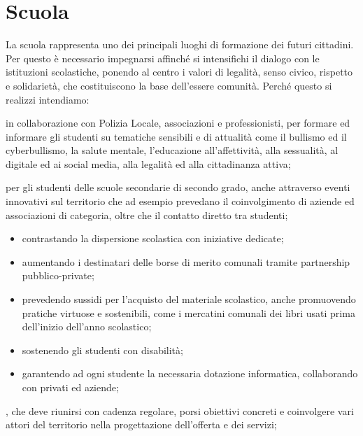 \section{Scuola}
La scuola rappresenta uno dei principali luoghi di formazione dei futuri cittadini. Per questo è necessario  impegnarsi affinché si intensifichi il dialogo con le istituzioni scolastiche, ponendo al centro i valori di legalità, senso civico, rispetto e solidarietà, che costituiscono la base dell'essere comunità. Perché questo si realizzi intendiamo:

 in collaborazione con Polizia Locale, associazioni e professionisti, per formare ed informare gli studenti su tematiche sensibili e di attualità come il bullismo ed il cyberbullismo, la salute mentale, l'educazione all'affettività, alla sessualità, al digitale ed ai social media, alla legalità ed alla cittadinanza attiva;

 per gli studenti delle scuole secondarie di secondo grado, anche attraverso eventi innovativi sul territorio che ad esempio prevedano il coinvolgimento di aziende ed associazioni di categoria, oltre che il contatto diretto tra studenti;

\begin{bluebox}
\begin{itemize}
  \item contrastando la dispersione scolastica con iniziative dedicate; 
  \item aumentando i destinatari delle borse di merito comunali tramite partnership pubblico-private;
  \item prevedendo sussidi per l'acquisto del materiale scolastico, anche promuovendo  pratiche virtuose e sostenibili, come i mercatini comunali dei libri usati prima dell'inizio dell'anno scolastico;
  \item sostenendo gli studenti con disabilità; 
  \item garantendo ad ogni studente la necessaria dotazione informatica, collaborando con privati ed aziende; 
\end{itemize}
\end{bluebox}

, che deve riunirsi con cadenza regolare, porsi obiettivi concreti e coinvolgere vari attori del territorio nella progettazione dell'offerta e dei servizi;


